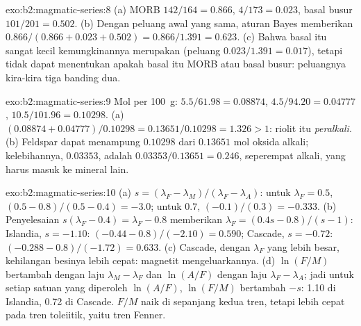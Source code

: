 \begin{solution}{exo:b2:magmatic-series:8}
(a) MORB $142/164 = 0.866$,  $4/173 = 0.023$, basal busur $101/201 =
0.502$. (b) Dengan peluang awal yang sama, aturan Bayes memberikan $0.866/(0.866 + 0.023 + 0.502) =
0.866/1.391 = 0.623$. (c) Bahwa basal itu sangat kecil kemungkinannya merupakan 
(peluang $0.023/1.391 = 0.017$), tetapi tidak dapat menentukan apakah basal itu MORB atau basal busur:
peluangnya kira-kira tiga banding dua.
\end{solution}

\begin{solution}{exo:b2:magmatic-series:9}
Mol per \qty{100}{g}:  $5.5/61.98 = 0.08874$,  $4.5/94.20 =
0.04777$,  $10.5/101.96 = 0.10298$. (a) $(0.08874 + 0.04777)/0.10298 =
0.13651/0.10298 = 1.326 > 1$: riolit itu \emph{peralkali}. (b) Feldspar dapat
menampung $0.10298$ dari $0.13651$ mol oksida alkali; kelebihannya, $0.03353$, adalah
$0.03353/0.13651 = 0.246$, seperempat alkali, yang harus masuk ke mineral lain.
\end{solution}

\begin{solution}{exo:b2:magmatic-series:10}
(a) $s = (\lambda_F - \lambda_M)/(\lambda_F - \lambda_A)$: untuk $\lambda_F = 0.5$, $(0.5
- 0.8)/(0.5 - 0.4) = -3.0$; untuk $0.7$, $(-0.1)/(0.3) = -0.333$. (b) Penyelesaian
$s(\lambda_F - 0.4) = \lambda_F - 0.8$ memberikan $\lambda_F = (0.4s - 0.8)/(s - 1)$:
Islandia, $s = -1.10$: $(-0.44 - 0.8)/(-2.10) = 0.590$; Cascade, $s = -0.72$:
$(-0.288 - 0.8)/(-1.72) = 0.633$. (c)  Cascade, dengan
$\lambda_F$ yang lebih besar, kehilangan besinya lebih cepat: magnetit mengeluarkannya. (d) $\ln(F/M)$ bertambah dengan
laju $\lambda_M - \lambda_F$ dan $\ln(A/F)$ dengan laju $\lambda_F - \lambda_A$; jadi untuk
setiap satuan yang diperoleh $\ln(A/F)$, $\ln(F/M)$ bertambah $-s$: 1.10 di Islandia, 0.72 di
Cascade. $F/M$ naik di sepanjang kedua tren, tetapi lebih cepat pada tren toleiitik, yaitu tren
Fenner.
\end{solution}

